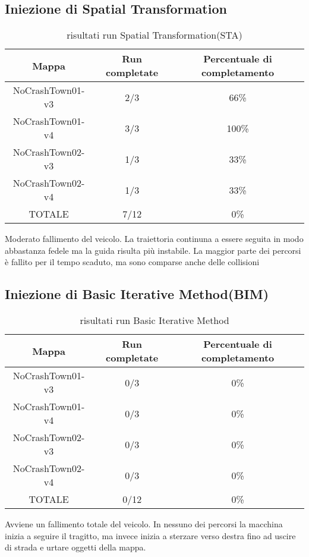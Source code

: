 \subsection{Iniezione di Spatial Transformation}
\begin{table}[h!]
    \begin{tabular}{|c|c|c|}
        \hline
        Mappa                   & Run completate & Percentuale di completamento\\
        \hline
        NoCrashTown01-v3        & 2/3            & 66\% \\
        NoCrashTown01-v4        & 3/3            & 100\% \\
        NoCrashTown02-v3        & 1/3            & 33\% \\
        NoCrashTown02-v4        & 1/3            & 33\%  \\
        TOTALE                  & 7/12           & 0\% \\
        \hline
    \end{tabular}
    \caption{risultati run Spatial Transformation(STA)}
    \label{tab:sta}
\end{table}
Moderato fallimento del veicolo. La traiettoria continuna a essere seguita in modo abbastanza fedele ma la guida risulta più instabile.
La maggior parte dei percorsi è fallito per il tempo scaduto, ma sono comparse anche delle collisioni
\subsection{Iniezione di Basic Iterative Method(BIM)}
\begin{table}[h!]
    \begin{tabular}{|c|c|c|}
        \hline
        Mappa                   & Run completate & Percentuale di completamento\\
        \hline
        NoCrashTown01-v3        & 0/3            & 0\% \\
        NoCrashTown01-v4        & 0/3            & 0\% \\
        NoCrashTown02-v3        & 0/3            & 0\% \\
        NoCrashTown02-v4        & 0/3            & 0\%  \\
        TOTALE                  & 0/12           & 0\% \\
        \hline
    \end{tabular}
    \caption{risultati run Basic Iterative Method}
    \label{tab:bim}
\end{table}
Avviene un fallimento totale del veicolo. In nessuno dei percorsi la macchina inizia a seguire il tragitto, ma invece inizia a sterzare verso destra fino ad uscire di strada
e  urtare oggetti della mappa.
